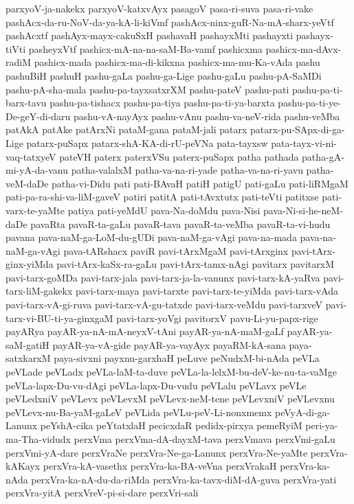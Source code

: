 {parxyoV-ja-nakekx
parxyoV-katxvAyx
pasagoV
pasa-ri-suva
pasa-ri-vake
pashAcx-da-ru-NoV-da-ya-kA-li-kiVmf
pashAcx-ninx-guR-Na-mA-sharx-yeVtf
pashAcxtf
pashAyx-mayx-cakuSxH
pashavaH
pashayxMti
pashayxti
pashayx-tiVti
pasheyxVtf
pashicx-mA-na-na-saM-Ba-vamf
pashicxma
pashicx-ma-dAvx-radiM
pashicx-mada
pashicx-ma-di-kikxna
pashicx-ma-mu-Ka-vAda
pashu
pashuBiH
pashuH
pashu-gaLa
pashu-ga-Lige
pashu-gaLu
pashu-pA-SaMDi
pashu-pA-sha-mala
pashu-pa-tayxsatxrXM
pashu-pateV
pashu-pati
pashu-pa-ti-barx-tavu
pashu-pa-tishacx
pashu-pa-tiya
pashu-pa-ti-ya-barxta
pashu-pa-ti-ye-De-geY-di-daru
pashu-vA-nayAyx
pashu-vAnu
pashu-va-neV-rida
pashu-veMba
patAkA
patAke
patArxNi
pataM-gana
pataM-jali
patarx
patarx-pu-SApx-di-ga-Lige
patarx-puSapx
patarx-shA-KA-di-rU-peVNa
pata-tayxsw
pata-tayx-vi-ni-vaq-tatxyeV
pateVH
paterx
paterxVSu
paterx-puSapx
patha
pathada
patha-gA-mi-yA-da-vanu
patha-valalxM
patha-va-na-ri-yade
patha-va-na-ri-yavu
patha-veM-daDe
patha-vi-Didu
pati
pati-BAvaH
patiH
patigU
pati-gaLu
pati-liRMgaM
pati-pa-ra-shi-va-liM-gaveV
patiri
patitA
pati-tAvxtutx
pati-teVti
patitxse
pati-varx-te-yaMte
patiya
pati-yeMdU
pava-Na-doMdu
pava-Nisi
pava-Ni-si-he-neM-daDe
pavaRta
pavaR-ta-gaLu
pavaR-tava
pavaR-ta-veMba
pavaR-ta-vi-hudu
pavana
pava-naM-ga-LoM-du-gUDi
pava-naM-ga-vAgi
pava-na-mada
pava-na-naM-ga-vAgi
pava-tARshacx
paviR
pavi-tArxMgaM
pavi-tArxginx
pavi-tArx-ginx-yiMda
pavi-tArx-kaSx-ra-gaLu
pavi-tArx-tamx-nAgi
pavitarx
pavitarxM
pavi-tarx-goMDa
pavi-tarx-jala
pavi-tarx-ja-la-vanunx
pavi-tarx-kA-yaRva
pavi-tarx-liM-gakekx
pavi-tarx-maya
pavi-tarxte
pavi-tarx-te-yiMda
pavi-tarx-vAda
pavi-tarx-vA-gi-ruva
pavi-tarx-vA-gu-tatxde
pavi-tarx-veMdu
pavi-tarxveV
pavi-tarx-vi-BU-ti-ya-ginxgaM
pavi-tarx-yoVgi
pavitorxV
pavu-Li-yu-papx-rige
payARya
payAR-ya-nA-mA-neyxV-tAni
payAR-ya-nA-maM-gaLf
payAR-ya-saM-gatiH
payAR-ya-vA-gide
payAR-ya-vayAyx
payaRM-kA-sana
paya-satxkarxM
paya-sivxni
payxnu-garxhaH
peLuve
peNudxM-bi-nAda
peVLa
peVLade
peVLadx
peVLa-laM-ta-duve
peVLa-la-lelxM-bu-deV-ke-nu-ta-vaMge
peVLa-lapx-Du-vu-dAgi
peVLa-lapx-Du-vudu
peVLalu
peVLavx
peVLe
peVLedxniV
peVLevx
peVLevxM
peVLevx-neM-tene
peVLevxniV
peVLevxnu
peVLevx-nu-Ba-yaM-gaLeV
peVLida
peVLu-peV-Li-nonxmemx
peVyA-di-ga-Lanunx
peYshA-cika
peYtatxlaH
pecicxdaR
pedidx-pirxya
pemeRyiM
peri-ya-ma-Tha-vidudx
perxVma
perxVma-dA-dayxM-tava
perxVmava
perxVmi-gaLu
perxVmi-yA-dare
perxVraNe
perxVra-Ne-ga-Lanunx
perxVra-Ne-yaMte
perxVra-kAKayx
perxVra-kA-vasethx
perxVra-ka-BA-veVna
perxVrakaH
perxVra-ka-nAda
perxVra-ka-nA-du-da-riMda
perxVra-ka-tavx-diM-dA-guva
perxVra-yati
perxVra-yitA
perxVreV-pi-si-dare
perxVri-sali
}
